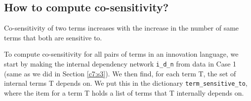 %
%
%    
%
%
%
%
%
%

\subsection{How to compute co-sensitivity?}
\label{c7:s4:ss1}
Co-sensitivity of two terms increases with the increase in the number of same terms that both are sensitive to.

To compute co-sensitivity for all pairs of terms in an innovation language, we start by making the internal dependency network \verb|i_d_n| from data in Case 1 (same as we did in Section \ref{c7:s3}). We then find, for each term T, the set of internal terms T depends on. We put this in the dictionary \verb|term_sensitive_to|, where the item for a term T holds a list of terms that T internally depends on.

